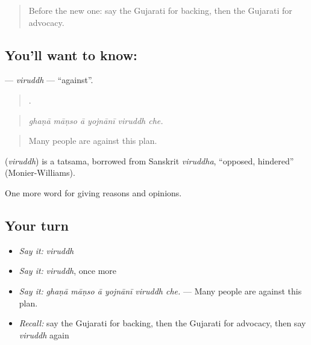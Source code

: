 \label{lesson:GU-C343-viruddh}



\begin{quote}
Before the new one: say the Gujarati for backing, then the Gujarati for advocacy.
\end{quote}

\subsection*{You'll want to know: }
\textbf{} — \emph{viruddh} — \textquotedblleft{}against\textquotedblright{}.

\begin{quote}
     .
\end{quote}

\begin{quote}
\emph{ghaṇā māṇso ā yojnānī viruddh che.}
\end{quote}

\begin{quote}
Many people are against this plan.
\end{quote}

\begin{cousinweb}
\textbf{} (\emph{viruddh}) is a tatsama, borrowed from Sanskrit \emph{viruddha}, \textquotedblleft{}opposed, hindered\textquotedblright{} (Monier-Williams).
\end{cousinweb}

\begin{grammarlens}[title={What you've built}]
One more word for giving reasons and opinions.
\end{grammarlens}

\subsection*{Your turn}
\begin{itemize}
\raggedright
  \item \emph{Say it:} \emph{viruddh}
  \item \emph{Say it:} \emph{viruddh}, once more
  \item \emph{Say it:} \emph{ghaṇā māṇso ā yojnānī viruddh che.} — Many people are against this plan.
  \item \emph{Recall:} say the Gujarati for backing, then the Gujarati for advocacy, then say \emph{viruddh} again
\end{itemize}

